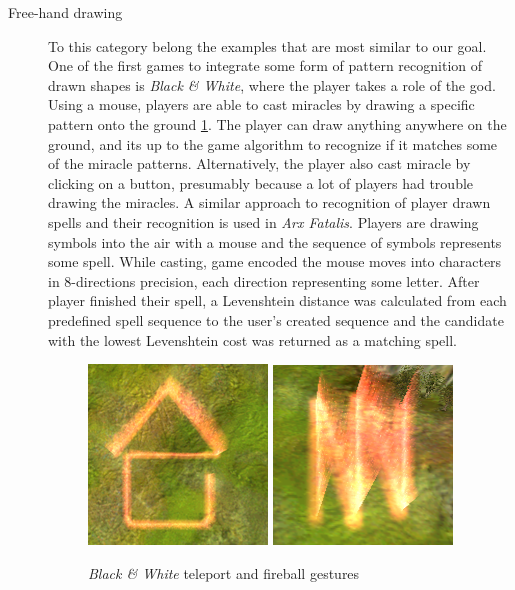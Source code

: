 \begin{description}
\item[Free-hand drawing]
To this category belong the examples that are most similar to our goal. One of the first games to integrate some form of pattern recognition of drawn shapes is \emph{Black \& White}, where the player takes a role of the god. Using a mouse, players are able to cast miracles by drawing a specific pattern onto the ground \ref{fig:blackwhite}. The player can draw anything anywhere on the ground, and its up to the game algorithm to recognize if it matches some of the miracle patterns. Alternatively, the player also cast miracle by clicking on a button, presumably because a lot of players had trouble drawing the miracles. 
A similar approach to recognition of player drawn spells and their recognition is used in \emph{Arx Fatalis}. Players are drawing symbols into the air with a mouse and the sequence of symbols represents some spell. While casting, game encoded the mouse moves into characters in 8-directions precision, each direction representing some letter. After player finished their spell, a Levenshtein distance was calculated from each predefined spell sequence to the user's created sequence and the candidate with the lowest Levenshtein cost was returned as a matching spell.

\begin{figure}
\centering
\includegraphics[width=.3\linewidth]{ext/gestureteleport.png}
\quad
\includegraphics[width=.3\linewidth]{ext/gesturefireball.png}
\caption{\emph{Black \& White} teleport and fireball gestures}
\label{fig:blackwhite}
\end{figure}

\end{description}

